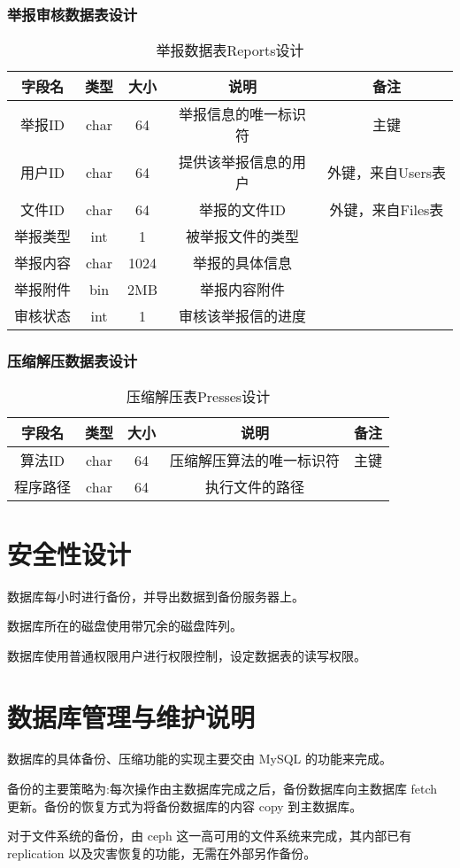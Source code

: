 \subsubsection{举报审核数据表设计}
\begin{table}[htbp]
\centering
\caption{举报数据表Reports设计} \label{tab:reports-database}
\begin{tabular}{|c|c|c|c|c|}
    \hline
    字段名 & 类型 & 大小 & 说明 & 备注 \\
    \hline
    举报ID & char & 64 & 举报信息的唯一标识符 & 主键\\
    \hline
    用户ID & char & 64 & 提供该举报信息的用户 & 外键，来自Users表\\
    \hline
    文件ID & char & 64 & 举报的文件ID & 外键，来自Files表\\
    \hline
    举报类型 & int & 1 & 被举报文件的类型 & \\
    \hline
    举报内容 & char & 1024 & 举报的具体信息 & \\
    \hline
    举报附件 & bin & 2MB & 举报内容附件 & \\
    \hline
    审核状态 & int & 1 & 审核该举报信的进度 & \\
    \hline
\end{tabular}
\end{table}

\subsubsection{压缩解压数据表设计}
\begin{table}[htbp]
\centering
\caption{压缩解压表Presses设计} \label{tab:presses-database}
\begin{tabular}{|c|c|c|c|c|}
    \hline
    字段名 & 类型 & 大小 & 说明 & 备注 \\
    \hline
    算法ID & char & 64 & 压缩解压算法的唯一标识符 & 主键\\
    \hline
    程序路径 & char & 64 & 执行文件的路径 & \\
    \hline
\end{tabular}
\end{table}

\section{安全性设计}
数据库每小时进行备份，并导出数据到备份服务器上。

数据库所在的磁盘使用带冗余的磁盘阵列。

数据库使用普通权限用户进行权限控制，设定数据表的读写权限。

\section{数据库管理与维护说明}
数据库的具体备份、压缩功能的实现主要交由 MySQL 的功能来完成。

备份的主要策略为:每次操作由主数据库完成之后，备份数据库向主数据库 fetch 更新。备份的恢复方式为将备份数据库的内容 copy 到主数据库。

对于文件系统的备份，由 ceph 这一高可用的文件系统来完成，其内部已有 replication 以及灾害恢复的功能，无需在外部另作备份。